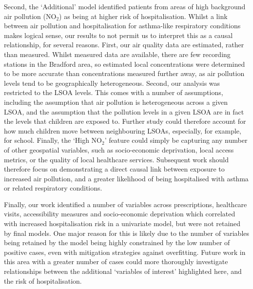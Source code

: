 Second, the `Additional' model identified patients from areas of high background air pollution (NO$_2$) as being at higher risk of hospitalisation. Whilst a link between air pollution and hospitalisation for asthma-like respiratory conditions makes logical sense, our results to not permit us to interpret this as a causal relationship, for several reasons. First, our air quality data are estimated, rather than measured. Whilst measured data are available, there are few recording stations in the Bradford area, so estimated local concentrations were determined to be more accurate than concentrations measured further away, as air pollution levels tend to be geographically heterogeneous. Second, our analysis was restricted to the LSOA levels. This comes with a number of assumptions, including the assumption that air pollution is heterogeneous across a given LSOA, and the assumption that the pollution levels in a given LSOA are in fact the levels that children are exposed to. Further study could therefore account for how much children move between neighbouring LSOAs, especially, for example, for school. Finally, the `High NO$_2$' feature could simply be capturing any number of other geospatial variables, such as socio-economic deprivation, local access metrics, or the quality of local healthcare services. Subsequent work should therefore focus on demonstrating a direct causal link between exposure to increased air pollution, and a greater likelihood of being hospitalised with asthma or related respiratory conditions.

Finally, our work identified a number of variables across prescriptions, healthcare visits, accessibility measures and socio-economic deprivation which correlated with increased hospitalisation risk in a univariate model, but were not retained by final models. One major reason for this is likely due to the number of variables being retained by the model being highly constrained by the low number of positive cases, even with mitigation strategies against overfitting. Future work in this area with a greater number of cases could more thoroughly investigate relationships between the additional `variables of interest' highlighted here, and the risk of hospitalisation.